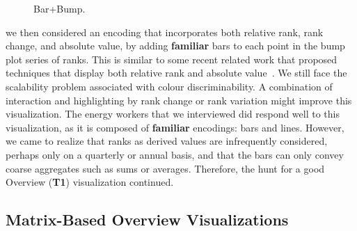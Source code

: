 \documentclass[journal]{vgtc}                %
\newcommand{\bstart}[1]{\vspace{1mm} \noindent{\textbf{#1:}}}
\begin{document}
\begin{figure}[ht]
	\centering
	\vspace{-0.3cm}
	\caption{Bar+Bump.}
	\label{fig:sandbox-barbump}
	\vspace{-0.3cm}
\end{figure}

\bstart{Bump + bar plots} we then considered an encoding that incorporates both relative rank, rank change, and absolute value, by adding {\bf familiar} bars to each point in the bump plot series of ranks. 
This is similar to some recent related work that proposed techniques that display both relative rank and absolute value~\cite{Gratzl2013,Hur2013}. 
We still face the scalability problem associated with colour discriminability. 
A combination of interaction and highlighting by rank change or rank variation might improve this visualization.
The energy workers that we interviewed did respond well to this visualization, as it is composed of {\bf familiar} encodings: bars and lines. 
However, we came to realize that ranks as derived values are infrequently considered, perhaps only on a quarterly or annual basis, and that the bars can only convey coarse aggregates such as sums or averages. 
Therefore, the hunt for a good Overview ({\bf T1}) visualization continued.


\subsection{Matrix-Based Overview Visualizations}
\label{design-matrix}
\end{document}
